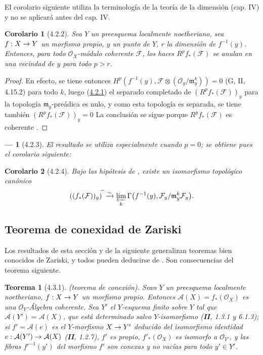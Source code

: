 \documentclass[10pt,oneside,openany]{book}
\theoremstyle{egaenv}\newtheorem*{env}{---}
\theoremstyle{egastatement}
\newtheorem*{theorem}{Teorema}
\newtheorem*{corollary}{Corolario}
\theoremstyle{egadescription}
\newcommand{\oldpage}[2][]{\marginnote{\normalfont\scriptsize\textbf{#1}\,|\,#2}\ignorespaces}
\renewcommand{\to}{\mathchoice{\longrightarrow}{\rightarrow}{\rightarrow}{\rightarrow}}
\begin{document}
El corolario siguiente utiliza la terminología de la teoría de la dimensión
(cap. IV) y no se aplicará antes del cap. IV.

\begin{corollary}[4.2.2]
\label{III.4.2.2}
\label{III.4.2.2-fr}
Sea $Y$ un preesquema localmente noetheriano, sea $f:X\to Y$ un morfismo
propio, $y$ un punto de $Y$, $r$ la dimensión de
$f^{-1}(y)$.
Entonces, para todo $\mathcal O_X$-módulo coherente $\mathcal F$, los haces
$R^pf_*(\mathcal F)$ se anulan en una vecindad de $y$ para todo
$p>r$.
\end{corollary}

\begin{proof}
En efecto, se tiene entonces
$H^p(f^{-1}(y),
\mathcal F\otimes(\mathcal O_y/\mathfrak m_y^k))=0$
(G, II, 4.15.2) para todo $k$, luego
(\hyperref[III.4.2.1-fr]{4.2.1}) el separado completado de
$(R^pf_*(\mathcal F))_y$ para la topología
$\mathfrak m_y$-preádica es nulo, y como esta topología es separada, se tiene también $(R^pf_*(\mathcal F))_y=0$
La conclusión se sigue porque $R^pf_*(\mathcal F)$ es coherente
.
\end{proof}

\begin{env}[4.2.3]
\label{III.4.2.3}
\label{III.4.2.3-fr}
El resultado  se utiliza especialmente cuando $p=0$; se obtiene pues el corolario siguiente:
\end{env}

\begin{corollary}[4.2.4]
\label{III.4.2.4}
\label{III.4.2.4-fr}
Bajo las hipótesis de \textup{}, existe un isomorfismo
topológico canónico
\[
((f_*(\mathcal F))_y)^{\widehat{\,}}
\xrightarrow{\sim}
\varprojlim_k\Gamma\bigl(f^{-1}(y),
\mathcal F_y/\mathfrak m_y^k\mathcal F_y\bigr).
\]
\end{corollary}


\subsection{Teorema de conexidad de Zariski}
\label{subsection:III.4.3}
\label{subsection:III.4.3-fr}
\label{III.4.3}
\label{III.4.3-fr}

Los resultados de esta sección y de la siguiente generalizan teoremas
bien conocidos de Zariski, y todos pueden deducirse de
. Son consecuencias del teorema siguiente.

\begin{theorem}[4.3.1]
\label{III.4.3.1-fr}
\textnormal{(teorema de conexión).}
Sean $Y$ un preesquema localmente noetheriano, $f:X\to Y$ un morfismo
propio. Entonces $\mathcal A(X)=f_*(\mathcal O_X)$ es una
$\mathcal O_Y$-Álgebra coherente.
\oldpage[III]{131}
Sea $Y'$ el $Y$-esquema finito sobre $Y$ tal que
$\mathcal A(Y')=\mathcal A(X)$, que está determinado salvo $Y$-isomorfismo
\textup{(\textbf{II}, 1.3.1 y 6.1.3)}; si $f'=\mathcal A(e)$ es el $Y$-morfismo
$X\to Y'$ deducido del isomorfismo identidad
$e:\mathcal A(Y')\to\mathcal A(X)$ \textup{(\textbf{II}, 1.2.7)}, $f'$ es propio,
$f'_*(\mathcal O_X)$ es isomorfo a $\mathcal O_{Y'}$, y las fibras
$f'^{-1}(y')$ del morfismo $f'$ son conexas y no vacías para todo
$y'\in Y'$.
\end{theorem}
\end{document}
